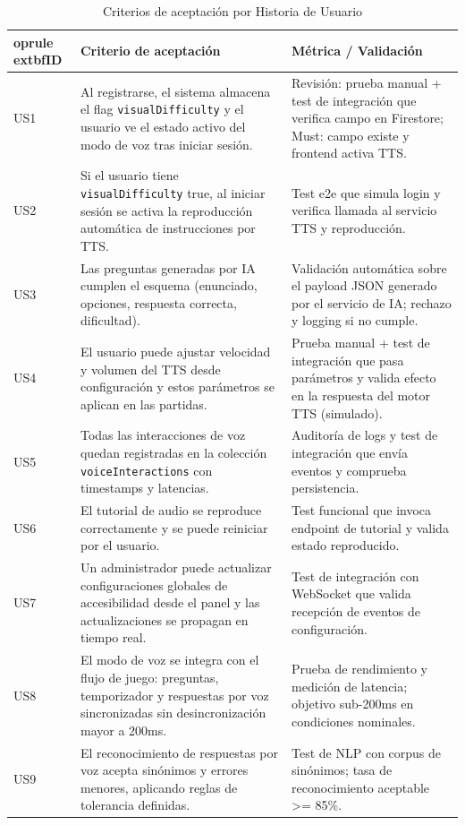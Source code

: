 \documentclass[12pt]{article}
\begin{document}
\clearpage
\begin{table}[!htbp]
\centering
\footnotesize
\caption{Criterios de aceptación por Historia de Usuario}
\begin{tabular}{@{}p{1.5cm} p{8cm} p{5cm}@{}}
	oprule
	extbf{ID} & \textbf{Criterio de aceptación} & \textbf{Métrica / Validación} \\
\midrule
US1 & Al registrarse, el sistema almacena el flag \texttt{visualDifficulty} y el usuario ve el estado activo del modo de voz tras iniciar sesión. & Revisión: prueba manual + test de integración que verifica campo en Firestore; Must: campo existe y frontend activa TTS. \\
US2 & Si el usuario tiene \texttt{visualDifficulty} true, al iniciar sesión se activa la reproducción automática de instrucciones por TTS. & Test e2e que simula login y verifica llamada al servicio TTS y reproducción. \\
US3 & Las preguntas generadas por IA cumplen el esquema (enunciado, opciones, respuesta correcta, dificultad). & Validación automática sobre el payload JSON generado por el servicio de IA; rechazo y logging si no cumple. \\
US4 & El usuario puede ajustar velocidad y volumen del TTS desde configuración y estos parámetros se aplican en las partidas. & Prueba manual + test de integración que pasa parámetros y valida efecto en la respuesta del motor TTS (simulado). \\
US5 & Todas las interacciones de voz quedan registradas en la colección \texttt{voiceInteractions} con timestamps y latencias. & Auditoría de logs y test de integración que envía eventos y comprueba persistencia. \\
US6 & El tutorial de audio se reproduce correctamente y se puede reiniciar por el usuario. & Test funcional que invoca endpoint de tutorial y valida estado reproducido. \\
US7 & Un administrador puede actualizar configuraciones globales de accesibilidad desde el panel y las actualizaciones se propagan en tiempo real. & Test de integración con WebSocket que valida recepción de eventos de configuración. \\
US8 & El modo de voz se integra con el flujo de juego: preguntas, temporizador y respuestas por voz sincronizadas sin desincronización mayor a 200ms. & Prueba de rendimiento y medición de latencia; objetivo sub-200ms en condiciones nominales. \\
US9 & El reconocimiento de respuestas por voz acepta sinónimos y errores menores, aplicando reglas de tolerancia definidas. & Test de NLP con corpus de sinónimos; tasa de reconocimiento aceptable >= 85\%. \\
\bottomrule
\end{tabular}
\label{tab:criterios-aceptacion}
\end{table}
\end{document}
